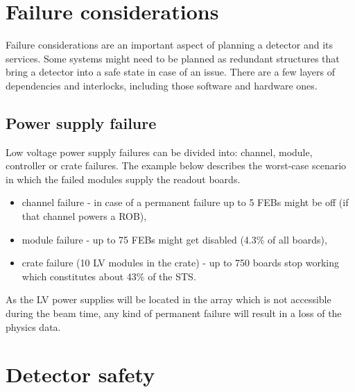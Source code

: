 \section{Failure considerations}

Failure considerations are an important aspect of planning a detector and its services. Some systems might need to be planned as redundant structures that bring a detector into a safe state in case of an issue. There are a few layers of dependencies and interlocks, including those software and hardware ones.

\subsection{Power supply failure}
Low voltage power supply failures can be divided into: channel, module, controller or crate failures. The example below describes the worst-case scenario in which the failed modules supply the readout boards.

\begin{itemize}
    \item channel failure - in case of a permanent failure up to 5 \gls{FEB}s might be off (if that channel powers a \gls{ROB}),
    \item module failure - up to 75 \gls{FEB}s might get disabled (4.3\% of all boards), 
    \item crate failure (10 LV modules in the crate) - up to 750 boards stop working which constitutes about 43\% of the STS.
\end{itemize}

As the LV power supplies will be located in the array which is not accessible during the beam time, any kind of permanent failure will result in a loss of the physics data. 

\section{Detector safety}
